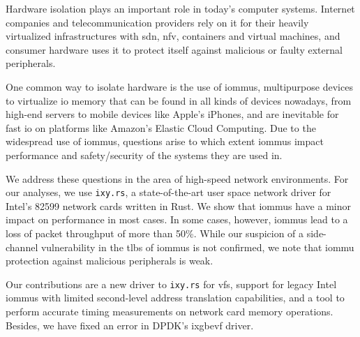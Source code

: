 \small

Hardware isolation plays an important role in today's computer systems.
Internet companies and telecommunication providers rely on it for their heavily
virtualized infrastructures with \acl{sdn}, \acl{nfv}, containers and virtual
machines, and consumer hardware uses it to protect itself against malicious or
faulty external peripherals.

One common way to isolate hardware is the use of \acp{iommu}, multipurpose
devices to virtualize \acs{io} memory that can be found in all kinds of devices
nowadays, from high-end servers to mobile devices like Apple's iPhones, and are
inevitable for fast \ac{io} on platforms like Amazon's Elastic Cloud Computing.
Due to the widespread use of \acp{iommu}, questions arise to which extent
\acp{iommu} impact performance and safety/security of the systems they are used
in.

We address these questions in the area of high-speed network environments. For
our analyses, we use \texttt{ixy.rs}, a state-of-the-art user space network
driver for Intel's 82599 network cards written in Rust. We show that \acp{iommu}
have a minor impact on performance in most cases. In some cases, however,
\acp{iommu} lead to a loss of packet throughput of more than 50\%. While our
suspicion of a side-channel vulnerability in the \aclp{tlb} of \acp{iommu} is
not confirmed, we note that \ac{iommu} protection against malicious peripherals
is weak.

Our contributions are a new driver to \texttt{ixy.rs} for \aclp{vf}, support for
legacy Intel \acp{iommu} with limited second-level address translation
capabilities, and a tool to perform accurate timing measurements on network card
memory operations. Besides, we have fixed an error in DPDK's ixgbevf driver.

